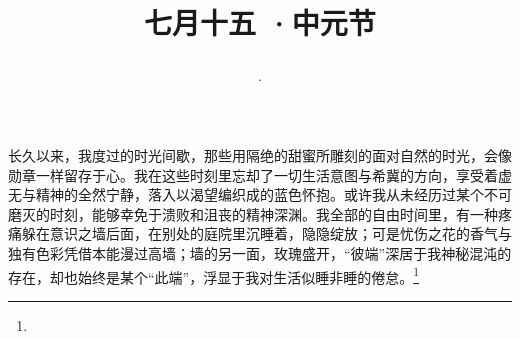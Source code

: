 \title{\date[d=18,m=8,y=2024][year:cn-y,年,month:cn,day:cn,日,·,weekday]·七月十五 ·中元节}
长久以来，我度过的时光间歇，那些用隔绝的甜蜜所雕刻的面对自然的时光，会像勋章一样留存于心。我在这些时刻里忘却了一切生活意图与希冀的方向，享受着虚无与精神的全然宁静，落入以渴望编织成的蓝色怀抱。或许我从未经历过某个不可磨灭的时刻，能够幸免于溃败和沮丧的精神深渊。我全部的自由时间里，有一种疼痛躲在意识之墙后面，在别处的庭院里沉睡着，隐隐绽放；可是忧伤之花的香气与独有色彩凭借本能漫过高墙；墙的另一面，玫瑰盛开，“彼端”深居于我神秘混沌的存在，却也始终是某个“此端”，浮显于我对生活似睡非睡的倦怠。\footnote{ }

